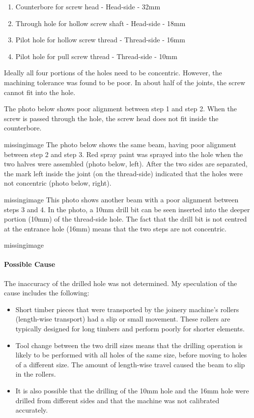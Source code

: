 \begin{enumerate}
    \item Counterbore for screw head - Head-side - 32mm
    \item Through hole for hollow screw shaft - Head-side - 18mm
    \item Pilot hole for hollow screw thread - Thread-side - 16mm
    \item Pilot hole for pull screw thread - Thread-side - 10mm

\end{enumerate}

Ideally all four portions of the holes need to be concentric. However, the machining tolerance was found to be poor. In about half of the joints, the screw cannot fit into the hole.

The photo below shows poor alignment between step 1 and step 2. When the screw is passed through the hole, the screw head does not fit inside the counterbore.

missingimage
The photo below shows the same beam, having poor alignment between step 2 and step 3. Red spray paint was sprayed into the hole when the two halves were assembled (photo below, left). After the two sides are separated, the mark left inside the joint (on the thread-side) indicated that the holes were not concentric (photo below, right).

missingimage
This photo shows another beam with a poor alignment between steps 3 and 4. In the photo, a 10mm drill bit can be seen inserted into the deeper portion (10mm) of the thread-side hole. The fact that the drill bit is not centred at the entrance hole (16mm) means that the two steps are not concentric.

missingimage

\paragraph{Possible Cause}
The inaccuracy of the drilled hole was not determined. My speculation of the cause includes the following:
\begin{itemize}
    \item Short timber pieces that were transported by the joinery machine’s rollers (length-wise transport) had a slip or small movement. These rollers are typically designed for long timbers and perform poorly for shorter elements.
    \item Tool change between the two drill sizes means that the drilling operation is likely to be performed with all holes of the same size, before moving to holes of a different size. The amount of length-wise travel caused the beam to slip in the rollers.
    \item It is also possible that the drilling of the 10mm hole and the 16mm hole were drilled from different sides and that the machine was not calibrated accurately.
\end{itemize}

